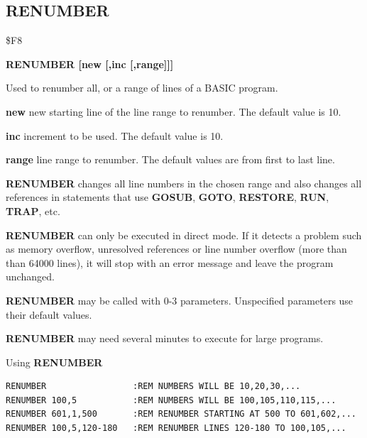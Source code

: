 \subsection{RENUMBER}
\begin{description}[leftmargin=2cm,style=nextline]
\item [Token:] \$F8
\item [Format:] {\bf RENUMBER [new [,inc [,range]]]}
\item [Usage:] Used to renumber all, or
               a range of lines of a BASIC program.

               {\bf new } new starting line of the
               line range to renumber.
               The default value is 10.

               {\bf inc } increment to be used.
               The default value is 10.

               {\bf range } line range to renumber.
               The default values are from first to last line.

               {\bf RENUMBER} changes all line numbers in
               the chosen range and also changes all references
               in statements that use {\bf GOSUB}, {\bf GOTO},
               {\bf RESTORE}, {\bf RUN}, {\bf TRAP}, etc.

               {\bf RENUMBER} can only be executed in direct mode.
               If it detects a problem such as memory overflow,
               unresolved references or line number overflow
               (more than than 64000 lines), it will stop with an error
               message and leave the program unchanged.

               {\bf RENUMBER} may be called with 0-3 parameters.
               Unspecified parameters use their default values.

\item [Remarks:] {\bf RENUMBER} may need several
                 minutes to execute for large programs.

\item [Examples:] Using {\bf RENUMBER}
\begin{tcolorbox}[colback=black,coltext=white]
\verbatimfont{\codefont}
\begin{verbatim}
RENUMBER                 :REM NUMBERS WILL BE 10,20,30,...
RENUMBER 100,5           :REM NUMBERS WILL BE 100,105,110,115,...
RENUMBER 601,1,500       :REM RENUMBER STARTING AT 500 TO 601,602,...
RENUMBER 100,5,120-180   :REM RENUMBER LINES 120-180 TO 100,105,...
\end{verbatim}
\end{tcolorbox}
\end{description}

